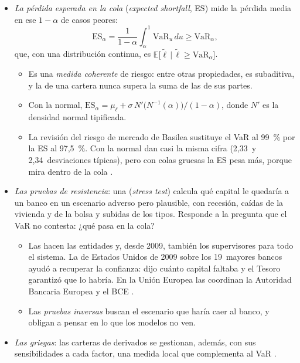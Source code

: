 \documentclass[11pt]{article}
\begin{document}
\begin{itemize}
\item \emph{La pérdida esperada en la cola} (\emph{expected shortfall}, ES) mide la pérdida media en ese $1-\alpha$ de casos peores:
  \[
  \mathrm{ES}_\alpha=\frac{1}{1-\alpha}\int_\alpha^1\mathrm{VaR}_u\,du\geq\mathrm{VaR}_\alpha ,
  \]
  que, con una distribución continua, es $\mathbb{E}\big[\tilde\ell\,\big|\,\tilde\ell\geq\mathrm{VaR}_\alpha\big]$.
  \begin{itemize}
  \item Es una \emph{medida coherente} de riesgo: entre otras propiedades, es subaditiva, y la de una cartera nunca supera la suma de las de sus partes\nocite{ArtznerEtAl1999Coherent}.
  \item Con la normal, $\mathrm{ES}_\alpha=\mu_\ell+\sigma\,N'\big(N^{-1}(\alpha)\big)/(1-\alpha)$, donde $N'$ es la densidad normal tipificada.
  \item La revisión del riesgo de mercado de Basilea sustituye el VaR al 99~\% por la ES al 97,5~\%\nocite{BCBS2019FRTB}. Con la normal dan casi la misma cifra (2,33~y 2,34~desviaciones típicas), pero con colas gruesas la ES pesa más, porque mira dentro de la cola .
  \end{itemize}
\item \emph{Las pruebas de resistencia}: una  (\emph{stress test}) calcula qué capital le quedaría a un banco en un escenario adverso pero plausible, con recesión, caídas de la vivienda y de la bolsa y subidas de los tipos. Responde a la pregunta que el VaR no contesta: ¿qué pasa en la cola?
  \begin{itemize}
  \item Las hacen las entidades y, desde 2009, también los supervisores para todo el sistema. La de Estados Unidos de 2009 sobre los 19~mayores bancos ayudó a recuperar la confianza: dijo cuánto capital faltaba y el Tesoro garantizó que lo habría\nocite{FED2009SCAP}. En la Unión Europea las coordinan la Autoridad Bancaria Europea y el BCE .
  \item Las \emph{pruebas inversas} buscan el escenario que haría caer al banco, y obligan a pensar en lo que los modelos no ven.
  \end{itemize}
\item \emph{Las griegas}: las carteras de derivados se gestionan, además, con sus sensibilidades a cada factor, una medida local que complementa al VaR .
\end{itemize}
\end{document}
